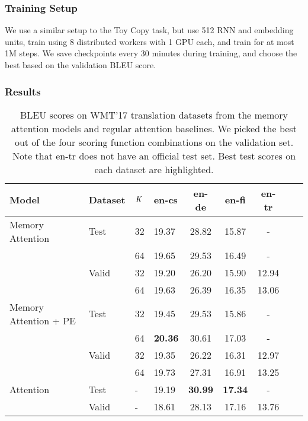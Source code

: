 \documentclass[11pt,letterpaper]{article}
\begin{document}
\subsubsection{Training Setup}

We use a similar setup to the Toy Copy task, but use 512 RNN and embedding units, train using 8 distributed workers with 1 GPU each, and train for at most 1M steps. We save checkpoints every 30 minutes during training, and choose the best based on the validation BLEU score.

\subsubsection{Results}

\begin{table*}[t]
\begin{centering}
\begin{tabular}{|l|l|l|l|c|c|c|c|c|}
    \hline
    Model & Dataset & $\emph{K}$         & en-cs & en-de & en-fi & en-tr \\
    \hline
    Memory Attention & Test & 32       & 19.37 & 28.82 & 15.87 & - \\
    && 64                       & 19.65 & 29.53 & 16.49 & - \\
    & Valid & 32                  & 19.20 & 26.20 & 15.90 & 12.94 \\
    && 64                       & 19.63 & 26.39 & 16.35 & 13.06\\
    \hline
    Memory Attention + PE & Test & 32    & 19.45 & 29.53 & 15.86 & - \\
    && 64                       & \textbf{20.36} & 30.61 & 17.03 & - \\
    & Valid & 32                  & 19.35 & 26.22 & 16.31 & 12.97\\
    && 64                       & 19.73 & 27.31 & 16.91 & 13.25 \\
    \hline
    Attention & Test & -         & 19.19 & \textbf{30.99} & \textbf{17.34} & - \\
    & Valid & -                    & 18.61 & 28.13 & 17.16 & 13.76 \\
    \hline
\end{tabular}
\caption{BLEU scores on WMT'17 translation datasets from the memory attention models and regular attention baselines. We picked the best out of the four scoring function combinations on the validation set. Note that en-tr does not have an official test set. Best test scores on each dataset are highlighted.}
\label{table:nmt}
\end{centering}
\end{table*}
\end{document}

